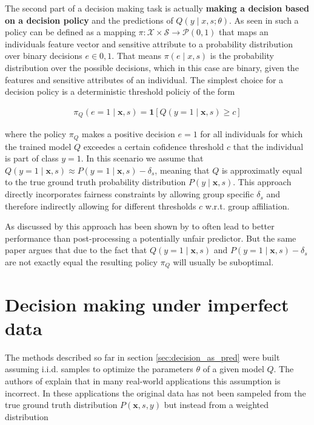 \documentclass[
	a4paper,
	11pt
	]{article}
\begin{document}
The second part of a decision making task is actually \textbf{making a decision based on a decision policy} and the predictions of $Q(y \mid x, s; \theta)$. As seen in \cite{Kilbertus19} such a policy can be defined as a mapping $\pi: \mathcal{X} \times \mathcal{S} \rightarrow \mathcal{P}({0,1})$ that maps an individuals feature vector and sensitive attribute to a probability distribution over binary decisions $e \in {0, 1}$. That means $\pi(e \mid x, s)$ is the probability distribution over the possible decisions, which in this case are binary, given the features and sensitive attributes of an individual. The simplest choice for a decision policy is a deterministic threshold policiy of the form

\begin{align*}
    \pi_{Q}(e = 1 \mid \boldsymbol{x}, s) = \boldsymbol{1}[Q(y = 1 \mid \boldsymbol{x}, s) \geq c]
\end{align*}

where the policy $\pi_{Q}$ makes a positive decision $e = 1$ for all individuals for which the trained model $Q$ exceedes a certain cofidence threshold $c$ that the individual is part of class $y = 1$. In this scenario we assume that $Q(y = 1 \mid \boldsymbol{x}, s) \approx P(y = 1 \mid \boldsymbol{x}, s) - \delta_s$, meaning that $Q$ is approximatly equal to the true ground truth probability distribution $P(y \mid \boldsymbol{x}, s)$. This approach directly incorporates fairness constraints by allowing group specific $\delta_s$ and therefore indirectly allowing for different thresholds $c$ w.r.t. group affiliation.

As discussed by \cite{Kilbertus19} this approach has been shown by \cite{Woodworth17} to often lead to better performance than post-processing a potentially unfair predictor. But the same paper argues that due to the fact that $Q(y = 1 \mid \boldsymbol{x}, s)$ and $P(y = 1 \mid \boldsymbol{x}, s) - \delta_s$ are not exactly equal the resulting policy $\pi_{Q}$ will usually be suboptimal.

\section{Decision making under imperfect data}
\label{sec:dec_under_imp_data}
The methods described so far in section \ref{sec:decision_as_pred} were built assuming i.i.d. samples to optimize the parameters $\theta$ of a given model $Q$. The authors of \cite{Kilbertus19} explain that in many real-world applications this assumption is incorrect. In these applications the original data has not been sampeled from the true ground truth distribution $P(\boldsymbol{x}, s, y)$ but instead from a weighted distribution 
\end{document}

